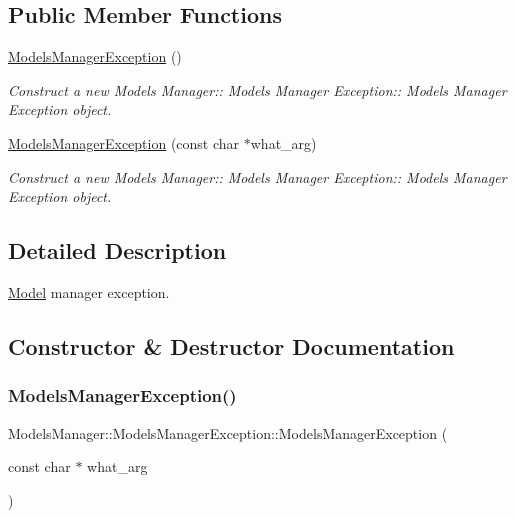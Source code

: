 \subsection*{Public Member Functions}
\begin{DoxyCompactItemize}
\item 
\mbox{\label{class_models_manager_1_1_models_manager_exception_ae6fcf5fb9f6e7195be00a90354d26f68}} 
\hyperlink{class_models_manager_1_1_models_manager_exception_ae6fcf5fb9f6e7195be00a90354d26f68}{Models\+Manager\+Exception} ()
\begin{DoxyCompactList}\small\item\em Construct a new Models Manager\+:\+: Models Manager Exception\+:\+: Models Manager Exception object. \end{DoxyCompactList}\item 
\hyperlink{class_models_manager_1_1_models_manager_exception_a3f957231b8234e9bc10877f85e94f20f}{Models\+Manager\+Exception} (const char $\ast$what\+\_\+arg)
\begin{DoxyCompactList}\small\item\em Construct a new Models Manager\+:\+: Models Manager Exception\+:\+: Models Manager Exception object. \end{DoxyCompactList}\end{DoxyCompactItemize}


\subsection{Detailed Description}
\hyperlink{class_model}{Model} manager exception. 

\subsection{Constructor \& Destructor Documentation}
\mbox{\label{class_models_manager_1_1_models_manager_exception_a3f957231b8234e9bc10877f85e94f20f}} 
\subsubsection{\texorpdfstring{Models\+Manager\+Exception()}{ModelsManagerException()}}
{\footnotesize\ttfamily Models\+Manager\+::\+Models\+Manager\+Exception\+::\+Models\+Manager\+Exception (\begin{DoxyParamCaption}\item[{const char $\ast$}]{what\+\_\+arg }\end{DoxyParamCaption})\hspace{0.3cm}{\ttfamily [explicit]}}



